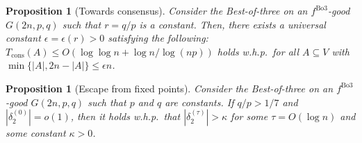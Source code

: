 \documentclass[letterpaper,11pt]{article}
\newtheorem{proposition}[theorem]{Proposition}
\newcommand{\Tcons}{T_{\mathrm{cons}}}
\newcommand{\Bthree}{\mathrm{Bo3}}
\begin{document}
\begin{proposition}[Towards consensus] \label{prop:fastconsensus_3M}
Consider the Best-of-three on an $f^{\Bthree}$-good $G(2n,p,q)$ such that $r=q/p$ is a constant.
Then, there exists a universal constant $\epsilon=\epsilon(r)>0$ satisfying the following: $\Tcons(A) \leq O(\log\log n+\log n/\log (np))$ holds w.h.p.~for all $A\subseteq V$ with $\min\{|A|,2n-|A|\}\leq \epsilon n$.
\end{proposition}

\begin{proposition}[Escape from fixed points] \label{prop:escape_3M}
Consider the Best-of-three on an $f^{\Bthree}$-good $G(2n,p,q)$ such that $p$ and $q$ are constants.
If $q/p>1/7$ and $|\delta_2^{(0)}|=o(1)$, then it holds w.h.p.~that $|\delta_2^{(\tau)}|>\kappa$ for some $\tau=O(\log n)$ and some constant $\kappa>0$.
\end{proposition}
%
\end{document}
